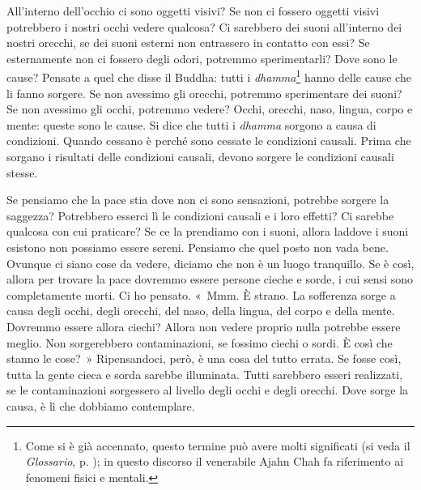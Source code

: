 All'interno dell'occhio ci sono oggetti visivi? Se non ci fossero
oggetti visivi potrebbero i nostri occhi vedere qualcosa? Ci sarebbero
dei suoni all'interno dei nostri orecchi, se dei suoni esterni non
entrassero in contatto con essi? Se esternamente non ci fossero degli
odori, potremmo sperimentarli? Dove sono le cause? Pensate a quel che
disse il Buddha: tutti i \emph{dhamma}\footnote{Come si è già accennato,
  questo termine può avere molti significati (si veda il
  \emph{Glossario}, p. \pageref{glossary-dhamma}); in questo discorso il venerabile Ajahn Chah fa
  riferimento ai fenomeni fisici e mentali.} hanno delle cause che li
fanno sorgere. Se non avessimo gli orecchi, potremmo sperimentare dei
suoni? Se non avessimo gli occhi, potremmo vedere? Occhi, orecchi, naso,
lingua, corpo e mente: queste sono le cause. Si dice che tutti i
\emph{dhamma} sorgono a causa di condizioni. Quando cessano è perché
sono cessate le condizioni causali. Prima che sorgano i risultati delle
condizioni causali, devono sorgere le condizioni causali stesse.

Se pensiamo che la pace stia dove non ci sono sensazioni, potrebbe
sorgere la saggezza? Potrebbero esserci lì le condizioni causali e i
loro effetti? Ci sarebbe qualcosa con cui praticare? Se ce la prendiamo
con i suoni, allora laddove i suoni esistono non possiamo essere sereni.
Pensiamo che quel posto non vada bene. Ovunque ci siano cose da vedere,
diciamo che non è un luogo tranquillo. Se è così, allora per trovare la
pace dovremmo essere persone cieche e sorde, i cui sensi sono
completamente morti. Ci ho pensato. «~Mmm. È strano. La sofferenza sorge
a causa degli occhi, degli orecchi, del naso, della lingua, del corpo e
della mente. Dovremmo essere allora ciechi? Allora non vedere proprio
nulla potrebbe essere meglio. Non sorgerebbero contaminazioni, se
fossimo ciechi o sordi. È così che stanno le cose?~» Ripensandoci, però,
è una cosa del tutto errata. Se fosse così, tutta la gente cieca e sorda
sarebbe illuminata. Tutti sarebbero esseri realizzati, se le
contaminazioni sorgessero al livello degli occhi e degli orecchi. Dove
sorge la causa, è lì che dobbiamo contemplare.

